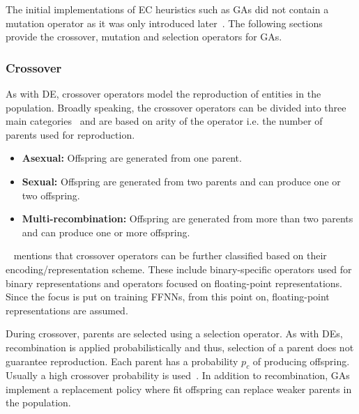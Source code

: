 The initial implementations of \acs{EC} heuristics such as \acp{GA} did not contain a mutation operator as it was only introduced later~\cite{ref:engelbrecht:2007}. The following sections provide the crossover, mutation and selection operators for \acp{GA}.

\subsubsection{Crossover}\label{sec:heuristics:mh:ga:crossover}

As with \acs{DE}, crossover operators model the reproduction of entities in the population. Broadly speaking, the crossover operators can be divided into three main categories~\cite{ref:engelbrecht:2007} and are based on arity of the operator i.e. the number of parents used for reproduction.

\begin{itemize}
	\item \textbf{Asexual:} Offspring are generated from one parent.

	\item \textbf{Sexual:} Offspring are generated from two parents and can produce one or two offspring.

	\item \textbf{Multi-recombination:} Offspring are generated from more than two parents and can produce one or more offspring.
\end{itemize}

\citeauthor{ref:engelbrecht:2007}~\cite{ref:engelbrecht:2007} mentions that crossover operators can be further classified based on their encoding/representation scheme. These include binary-specific operators used for binary representations and operators focused on floating-point representations. Since the focus is put on training \acp{FFNN}, from this point on, floating-point representations are assumed.

During crossover, parents are selected using a selection operator. As with \acp{DE}, recombination is applied probabilistically and thus, selection of a parent does not guarantee reproduction. Each parent has a probability $p_{c}$ of producing offspring. Usually a high crossover probability is used~\cite{ref:engelbrecht:2007}. In addition to recombination, \acp{GA} implement a replacement policy where fit offspring can replace weaker parents in the population.


